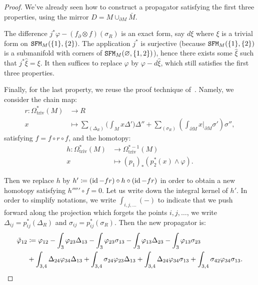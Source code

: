\begin{proof}
  We've already seen how to construct a propagator satisfying the first three properties, using the mirror $D = M \cup_{\partial M} \bar{M}$.

  The difference $j^{*} \varphi - (f_{\partial} \otimes f)(\sigma_{R})$ is an exact form, say $d \xi$ where $\xi$ is a trivial form on $\mathtt{SFM}_{M}(\{1\}, \{2\})$.
  The application $j^{*}$ is surjective (because $\mathtt{SFM}_{M}(\{1\}, \{2\})$ is a submanifold with corners of $\mathtt{SFM}_{M}(\varnothing, \{1,2\})$), hence there exists some $\hat{\xi}$ such that $j^{*} \hat{\xi} = \xi$.
  It then suffices to replace $\varphi$ by $\varphi - d \hat{\xi}$, which still satisfies the first three properties.

  Finally, for the last property, we reuse the proof technique of~\cite[Lemma~3]{CattaneoMneev2010}.
  Namely, we consider the chain map:
  \begin{align*}
    r : \Omega^{*}_{\mathrm{triv}}(M) & \to R \\
    x & \mapsto \sum_{(\Delta_{R})} \bigl( \int_{M} x \Delta' \bigr) \Delta'' + \sum_{(\sigma_{R})} (\int_{\partial M} x|_{\partial M} \sigma') \sigma'',
  \end{align*}
  satisfying $f = f \circ r \circ f$, and the homotopy:
  \begin{align*}
    h : \Omega^{*}_{\mathrm{triv}}(M) & \to \Omega^{*-1}_{\mathrm{triv}}(M) \\
    x & \mapsto (p_{1})_{*}(p^{*}_{2}(x) \wedge \varphi).
  \end{align*}

  Then we replace $h$ by $h' \coloneqq (\operatorname{id} - fr) \circ h \circ (\operatorname{id} - fr)$ in order to obtain a new homotopy satisfying $h''''' \circ f = 0$.
  Let us write down the integral kernel of $h'$.
  In order to simplify notations, we write $\int_{i,j,\dots} (-)$ to indicate that we push forward along the projection which forgets the points $i, j, \dots$, we write $\Delta_{ij} = p_{ij}^{*}(\Delta_{R})$ and $\sigma_{ij} = p_{ij}^{*}(\sigma_{R})$.
  Then the new propagator is:
  \begin{align*}
    \tilde\varphi_{12}
    & \coloneq \varphi_{12} - \int_{3} \varphi_{23} \Delta_{13} - \int_{3} \varphi_{23} \sigma_{13} - \int_{3} \varphi_{13} \Delta_{23} - \int_{3} \varphi_{13} \sigma_{23} \\
    & + \int_{3,4} \Delta_{24} \varphi_{34} \Delta_{13} + \int_{3,4} \sigma_{24} \varphi_{23} \Delta_{13} + \int_{3,4} \Delta_{24} \varphi_{34} \sigma_{13} + \int_{3,4} \sigma_{42} \varphi_{34} \sigma_{13}.
      \qedhere
  \end{align*}


\end{proof}
